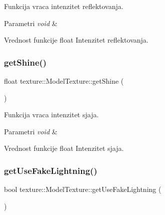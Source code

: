 Funkcija vraca intenzitet reflektovanja. 


\begin{DoxyParams}{Parametri}
{\em void} & \\
\hline
\end{DoxyParams}
\begin{DoxyReturn}{Vrednost funkcije}
float Intenzitet reflektovanja. 
\end{DoxyReturn}
\mbox{\label{classtexture_1_1ModelTexture_a2336ba8c1ccc1eea9419fb2cd3773888}} 
\subsubsection{\texorpdfstring{get\+Shine()}{getShine()}}
{\footnotesize\ttfamily float texture\+::\+Model\+Texture\+::get\+Shine (\begin{DoxyParamCaption}{ }\end{DoxyParamCaption})}



Funkcija vraca intenzitet sjaja. 


\begin{DoxyParams}{Parametri}
{\em void} & \\
\hline
\end{DoxyParams}
\begin{DoxyReturn}{Vrednost funkcije}
float Intenzitet sjaja. 
\end{DoxyReturn}
\mbox{\label{classtexture_1_1ModelTexture_adc202fd47232d085312fea26bc17d69e}} 
\subsubsection{\texorpdfstring{get\+Use\+Fake\+Lightning()}{getUseFakeLightning()}}
{\footnotesize\ttfamily bool texture\+::\+Model\+Texture\+::get\+Use\+Fake\+Lightning (\begin{DoxyParamCaption}{ }\end{DoxyParamCaption})}



